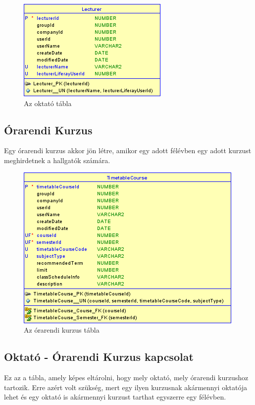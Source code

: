 \documentclass[hidelinks, 12pt, a4paper]{report}
\begin{document}
\begin{figure}[H]
    \centering
	\includegraphics{lecturer.png}
	\caption{Az oktató tábla}
\end{figure}

\subsection{Órarendi Kurzus}

Egy órarendi kurzus akkor jön létre, amikor egy adott félévben egy adott kurzust meghirdetnek a hallgatók számára.

\begin{figure}[H]
    \centering
	\includegraphics{timetable_course.png}
	\caption{Az órarendi kurzus tábla}
\end{figure}

\subsection{Oktató - Órarendi Kurzus kapcsolat}

Ez az a tábla, amely képes eltárolni, hogy mely oktató, mely órarendi kurzushoz tartozik. Erre azért volt szükség, mert egy ilyen kurzusnak akármennyi oktatója lehet  és egy oktató is akármennyi kurzust tarthat egyszerre egy félévben.
\end{document}
